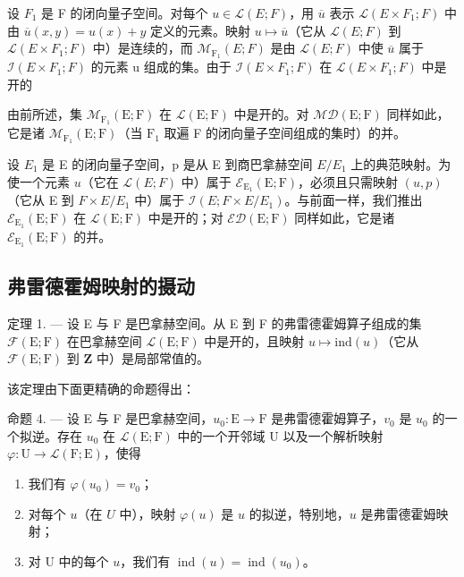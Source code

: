 设 \(F_{1}\) 是 F 的闭向量子空间。对每个 \(u \in \mathcal{L}(E;F)\)，用 \(\overline{u}\) 表示 \(\mathcal{L}(E \times F_{1};F)\) 中由 \(\overline{u}(x,y) = u(x) + y\) 定义的元素。映射 \(u \mapsto \overline{u}\)（它从 \(\mathcal{L}(E;F)\) 到 \(\mathcal{L}(E \times F_{1};F)\) 中）是连续的，而 \(\mathcal{M}_{\mathrm{F}_{1}}(E;F)\) 是由 \(\mathcal{L}(E;F)\) 中使 \(\overline{u}\) 属于 \(\mathcal{I}(E \times F_{1};F)\) 的元素 u 组成的集。由于 \(\mathcal{I}(E \times F_{1};F)\) 在 \(\mathcal{L}(E \times F_{1};F)\) 中是开的

由前所述，集 \(\mathcal{M}_{\mathrm{F}_1}(\mathrm{E};\mathrm{F})\) 在 \(\mathcal{L}(\mathrm{E};\mathrm{F})\) 中是开的。对 \(\mathcal{MD}(\mathrm{E};\mathrm{F})\) 同样如此，它是诸 \(\mathcal{M}_{\mathrm{F}_1}(\mathrm{E};\mathrm{F})\)（当 \(\mathrm{F}_1\) 取遍 F 的闭向量子空间组成的集时）的并。

设 \(E_{1}\) 是 E 的闭向量子空间，p 是从 E 到商巴拿赫空间 \(E/E_{1}\) 上的典范映射。为使一个元素 \(u\)（它在 \(\mathcal{L}(E;F)\) 中）属于 \(\mathcal{E}_{\mathrm{E}_{1}}(\mathrm{E};\mathrm{F})\)，必须且只需映射 \((u,p)\)（它从 E 到 \(F\times E/E_{1}\) 中）属于 \(\mathcal{I}(E;F\times E/E_{1})\)。与前面一样，我们推出 \(\mathcal{E}_{\mathrm{E}_{1}}(\mathrm{E};\mathrm{F})\) 在 \(\mathcal{L}(\mathrm{E};\mathrm{F})\) 中是开的；对 \(\mathcal{E}\mathcal{D}(\mathrm{E};\mathrm{F})\) 同样如此，它是诸 \(\mathcal{E}_{\mathrm{E}_{1}}(\mathrm{E};\mathrm{F})\) 的并。

\subsection{弗雷德霍姆映射的摄动}

定理 1. --- 设 E 与 F 是巴拿赫空间。从 E 到 F 的弗雷德霍姆算子组成的集 \(\mathcal{F}(\mathrm{E};\mathrm{F})\) 在巴拿赫空间 \(\mathcal{L}(\mathrm{E};\mathrm{F})\) 中是开的，且映射 \(u\mapsto\mathrm{ind}(u)\)（它从 \(\mathcal{F}(\mathrm{E};\mathrm{F})\) 到 \(\mathbf{Z}\) 中）是局部常值的。

该定理由下面更精确的命题得出：

命题 4. --- 设 E 与 F 是巴拿赫空间，\(u_{0}\colon\mathrm{E}\to\mathrm{F}\) 是弗雷德霍姆算子，\(v_{0}\) 是 \(u_{0}\) 的一个拟逆。存在 \(u_{0}\) 在 \(\mathcal{L}(\mathrm{E};\mathrm{F})\) 中的一个开邻域 U 以及一个解析映射 \(\varphi\colon\mathrm{U}\to\mathcal{L}(\mathrm{F};\mathrm{E})\)，使得

\begin{enumerate}
\def\labelenumi{(\roman{enumi})}
\item
  我们有 \(\varphi(u_{0}) = v_{0}\)；
\item
  对每个 \(u\)（在 \(U\) 中），映射 \(\varphi(u)\) 是 \(u\) 的拟逆，特别地，\(u\) 是弗雷德霍姆映射；
\item
  对 U 中的每个 \(u\)，我们有 \(\operatorname{ind}(u) = \operatorname{ind}(u_0)\)。
\end{enumerate}

